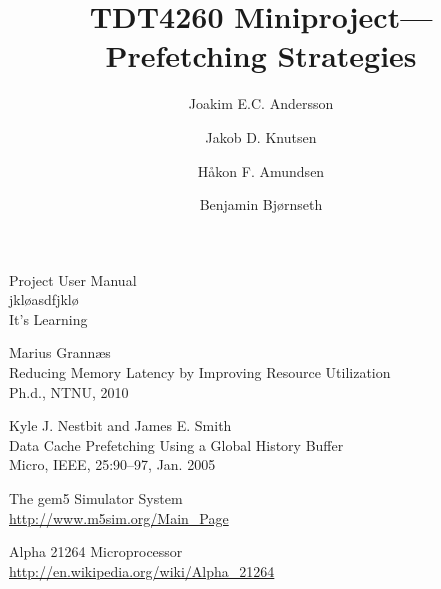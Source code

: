 \documentclass[journal]{IEEEtran/IEEEtran}
\title{TDT4260 Miniproject---Prefetching Strategies}
\author{Joakim E.C. Andersson \and Jakob D. Knutsen \and Håkon F. Amundsen \and Benjamin Bjørnseth}
\begin{document}
\maketitle











\begin{thebibliography}{9}

Project User Manual\\
jkløasdfjklø\\
It's Learning

Marius Grannæs\\
Reducing Memory Latency by Improving Resource Utilization\\
Ph.d., NTNU, 2010

Kyle J. Nestbit and James E. Smith\\
Data Cache Prefetching Using a Global History Buffer\\
Micro, IEEE, 25:90–97, Jan. 2005

The gem5 Simulator System\\
\url{http://www.m5sim.org/Main_Page}

Alpha 21264 Microprocessor\\
\url{http://en.wikipedia.org/wiki/Alpha_21264}

\end{thebibliography}
\end{document}
